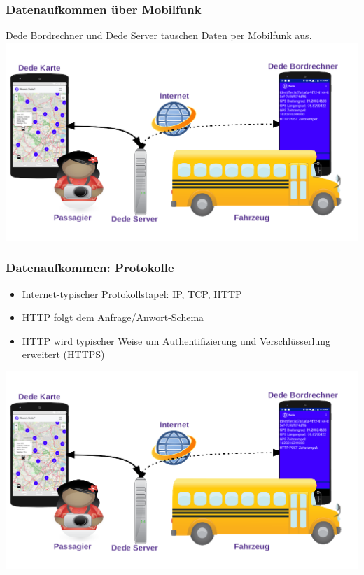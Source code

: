 
\begin{frame}
  \frametitle{Datenaufkommen über Mobilfunk}
  Dede Bordrechner und Dede Server tauschen Daten per Mobilfunk aus.
  \includegraphics[width=\paperwidth]{dede/dede-concept}
\end{frame}

\begin{frame}
  \frametitle{Datenaufkommen: Protokolle}
  \begin{itemize}
  \item Internet-typischer Protokollstapel: IP, TCP, HTTP
  \item HTTP folgt dem Anfrage/Anwort-Schema
  \item HTTP wird typischer Weise um Authentifizierung und Verschlüsserlung erweitert (HTTPS)
  \end{itemize}
  \includegraphics[width=0.5\paperwidth]{dede/dede-concept}
\end{frame}

